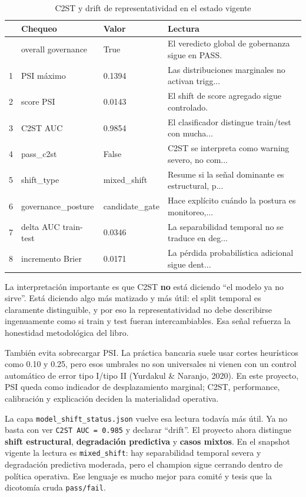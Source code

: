 \documentclass[
  spanish,
  11pt,
  letterpaper,
]{scrbook}
\theoremstyle{plain}
\theoremstyle{remark}
\begin{document}
{

\begin{longtable}[]{@{}llll@{}}

\caption{\label{tbl-mrm-c2st}C2ST y drift de representatividad en el
estado vigente}

\tabularnewline

\toprule\noalign{}
& Chequeo & Valor & Lectura \\
\midrule\noalign{}
\endhead
\bottomrule\noalign{}
\endlastfoot
0 & overall governance & True & El veredicto global de gobernanza sigue
en PASS. \\
1 & PSI máximo & 0.1394 & Las distribuciones marginales no activan
trigg... \\
2 & score PSI & 0.0143 & El shift de score agregado sigue controlado. \\
3 & C2ST AUC & 0.9854 & El clasificador distingue train/test con
mucha... \\
4 & pass\_c2st & False & C2ST se interpreta como warning severo, no
com... \\
5 & shift\_type & mixed\_shift & Resume si la señal dominante es
estructural, p... \\
6 & governance\_posture & candidate\_gate & Hace explícito cuándo la
postura es monitoreo,... \\
7 & delta AUC train-test & 0.0346 & La separabilidad temporal no se
traduce en deg... \\
8 & incremento Brier & 0.0171 & La pérdida probabilística adicional
sigue dent... \\

\end{longtable}

}

La interpretación importante es que C2ST \textbf{no} está diciendo ``el
modelo ya no sirve''. Está diciendo algo más matizado y más útil: el
split temporal es claramente distinguible, y por eso la
representatividad no debe describirse ingenuamente como si train y test
fueran intercambiables. Esa señal refuerza la honestidad metodológica
del libro.

También evita sobrecargar PSI. La práctica bancaria suele usar cortes
heurísticos como 0.10 y 0.25, pero esos umbrales no son universales ni
vienen con un control automático de error tipo I/tipo II (Yurdakul \&
Naranjo, 2020). En este proyecto, PSI queda como indicador de
desplazamiento marginal; C2ST, performance, calibración y explicación
deciden la materialidad operativa.

La capa \texttt{model\_shift\_status.json} vuelve esa lectura todavía
más útil. Ya no basta con ver \texttt{C2ST\ AUC\ =\ 0.985} y declarar
``drift''. El proyecto ahora distingue \textbf{shift estructural},
\textbf{degradación predictiva} y \textbf{casos mixtos}. En el snapshot
vigente la lectura es \texttt{mixed\_shift}: hay separabilidad temporal
severa y degradación predictiva moderada, pero el champion sigue
cerrando dentro de política operativa. Ese lenguaje es mucho mejor para
comité y tesis que la dicotomía cruda \texttt{pass/fail}.
\end{document}

